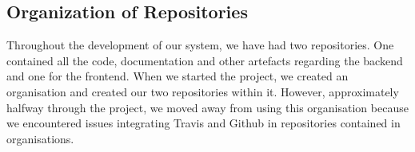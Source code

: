 \subsection{Organization of Repositories}

Throughout the development of our system, we have had two repositories. One contained all the code, documentation and other artefacts regarding the backend and one for the frontend. When we started the project, we created an organisation and created our two repositories within it. However, approximately halfway through the project, we moved away from using this organisation because we encountered issues integrating Travis and Github in repositories contained in organisations.
